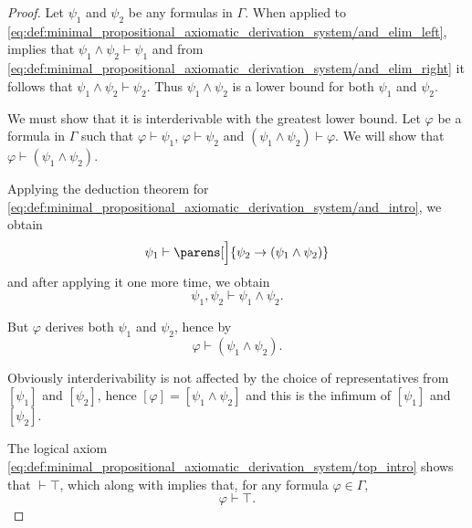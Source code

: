 \begin{proof}
   Let \( \psi_1 \) and \( \psi_2 \) be any formulas in \( \Gamma \). When applied to \eqref{eq:def:minimal_propositional_axiomatic_derivation_system/and_elim_left},  implies that \( \psi_1 \wedge \psi_2 \vdash \psi_1 \) and from \eqref{eq:def:minimal_propositional_axiomatic_derivation_system/and_elim_right} it follows that \( \psi_1 \wedge \psi_2 \vdash \psi_2 \). Thus \( \psi_1 \wedge \psi_2 \) is a lower bound for both \( \psi_1 \) and \( \psi_2 \).

  We must show that it is interderivable with the greatest lower bound. Let \( \varphi \) be a formula in \( \Gamma \) such that \( \varphi \vdash \psi_1 \), \( \varphi \vdash \psi_2 \) and \( (\psi_1 \wedge \psi_2) \vdash \varphi \). We will show that \( \varphi \vdash (\psi_1 \wedge \psi_2) \).

  Applying the deduction theorem for \eqref{eq:def:minimal_propositional_axiomatic_derivation_system/and_intro}, we obtain
  \begin{equation*}
    \psi_1 \vdash \parens[\Big]{ \psi_2 \rightarrow (\psi_1 \wedge \psi_2) }
  \end{equation*}
  and after applying it one more time, we obtain
  \begin{equation*}
    \psi_1, \psi_2 \vdash \psi_1 \wedge \psi_2.
  \end{equation*}

  But \( \varphi \) derives both \( \psi_1 \) and \( \psi_2 \), hence by 
  \begin{equation*}
    \varphi \vdash (\psi_1 \wedge \psi_2).
  \end{equation*}

  Obviously interderivability is not affected by the choice of representatives from \( [\psi_1] \) and \( [\psi_2] \), hence \( [\varphi] = [\psi_1 \wedge \psi_2] \) and this is the infimum of \( [\psi_1] \) and \( [\psi_2] \).

   The logical axiom \eqref{eq:def:minimal_propositional_axiomatic_derivation_system/top_intro} shows that \( \vdash \top \), which along with  implies that, for any formula \( \varphi \in \Gamma \),
  \begin{equation*}
    \varphi \vdash \top.
  \end{equation*}


\end{proof}
